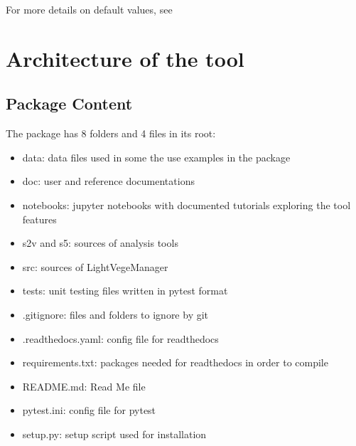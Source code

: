 \documentclass[letterpaper,10pt,english]{sphinxmanual}
\begin{document}
\nopagebreak


\sphinxAtStartPar
For more details on default values, see 



\sphinxstepscope


\section{Architecture of the tool}
\label{\detokenize{architecture:architecture-of-the-tool}}\label{\detokenize{architecture:architecture}}\label{\detokenize{architecture::doc}}

\subsection{Package Content}
\label{\detokenize{architecture:package-content}}\label{\detokenize{architecture:package}}
\sphinxAtStartPar
The package has 8 folders and 4 files in its root:
\begin{itemize}
\item {} 
\sphinxAtStartPar
data: data files used in some the use examples in the package

\item {} 
\sphinxAtStartPar
doc: user and reference documentations

\item {} 
\sphinxAtStartPar
notebooks: jupyter notebooks with documented tutorials exploring the tool features

\item {} 
\sphinxAtStartPar
s2v and s5: sources of analysis tools

\item {} 
\sphinxAtStartPar
src: sources of LightVegeManager

\item {} 
\sphinxAtStartPar
tests: unit testing files written in pytest format

\item {} 
\sphinxAtStartPar
.gitignore: files and folders to ignore by git

\item {} 
\sphinxAtStartPar
.readthedocs.yaml: config file for read\sphinxhyphen{}the\sphinxhyphen{}docs

\item {} 
\sphinxAtStartPar
requirements.txt: packages needed for read\sphinxhyphen{}the\sphinxhyphen{}docs in order to compile

\item {} 
\sphinxAtStartPar
README.md: Read Me file

\item {} 
\sphinxAtStartPar
pytest.ini: config file for pytest

\item {} 
\sphinxAtStartPar
setup.py: setup script used for installation

\end{itemize}
\end{document}
